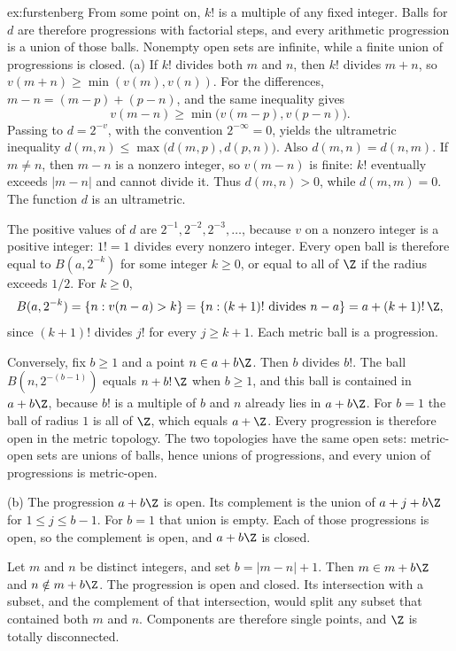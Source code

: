 \begin{solution}{ex:furstenberg}
\idea From some point on, $k!$ is a multiple of any fixed integer. Balls for $d$ are therefore progressions with factorial steps, and every arithmetic progression is a union of those balls. Nonempty open sets are infinite, while a finite union of progressions is closed.
\writeup (a) If $k!$ divides both $m$ and $n$, then $k!$ divides $m+n$, so $v(m+n)\ge\min(v(m),v(n))$. For the differences, $m-n=(m-p)+(p-n)$, and the same inequality gives
\[
v(m-n)\ge\min\bigl(v(m-p),v(p-n)\bigr).
\]
Passing to $d=2^{-v}$, with the convention $2^{-\infty}=0$, yields the ultrametric inequality $d(m,n)\le\max\bigl(d(m,p),d(p,n)\bigr)$. Also $d(m,n)=d(n,m)$. If $m\ne n$, then $m-n$ is a nonzero integer, so $v(m-n)$ is finite: $k!$ eventually exceeds $|m-n|$ and cannot divide it. Thus $d(m,n)>0$, while $d(m,m)=0$. The function $d$ is an ultrametric.

The positive values of $d$ are $2^{-1},2^{-2},2^{-3},\ldots$, because $v$ on a nonzero integer is a positive integer: $1!=1$ divides every nonzero integer. Every open ball is therefore equal to $B(a,2^{-k})$ for some integer $k\ge0$, or equal to all of $\Z$ if the radius exceeds $1/2$. For $k\ge0$,
\[
B(a,2^{-k})=\{n:v(n-a)>k\}=\{n:(k+1)!\text{ divides }n-a\}=a+(k+1)!\,\Z,
\]
since $(k+1)!$ divides $j!$ for every $j\ge k+1$. Each metric ball is a progression.

Conversely, fix $b\ge1$ and a point $n\in a+b\Z$. Then $b$ divides $b!$. The ball $B(n,2^{-(b-1)})$ equals $n+b!\,\Z$ when $b\ge1$, and this ball is contained in $a+b\Z$, because $b!$ is a multiple of $b$ and $n$ already lies in $a+b\Z$. For $b=1$ the ball of radius $1$ is all of $\Z$, which equals $a+\Z$. Every progression is therefore open in the metric topology. The two topologies have the same open sets: metric-open sets are unions of balls, hence unions of progressions, and every union of progressions is metric-open.

(b) The progression $a+b\Z$ is open. Its complement is the union of $a+j+b\Z$ for $1\le j\le b-1$. For $b=1$ that union is empty. Each of those progressions is open, so the complement is open, and $a+b\Z$ is closed.

Let $m$ and $n$ be distinct integers, and set $b=|m-n|+1$. Then $m\in m+b\Z$ and $n\notin m+b\Z$. The progression is open and closed. Its intersection with a subset, and the complement of that intersection, would split any subset that contained both $m$ and $n$. Components are therefore single points, and $\Z$ is totally disconnected.


\end{solution}
